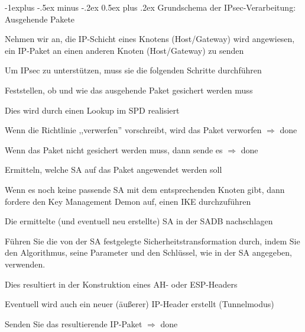 \documentclass[a4paper]{article}
\makeatletter
\renewcommand{\subsection}{\@startsection{subsection}{2}{0mm}%
 {-1explus -.5ex minus -.2ex}%
 {0.5ex plus .2ex}%
 {\normalfont\normalsize\bfseries}}
\makeatother
\begin{document}
\begin{multicols}{3}
      \subsection{Grundschema der IPsec-Verarbeitung: Ausgehende Pakete}
      \begin{itemize*}
            \item Nehmen wir an, die IP-Schicht eines Knotens (Host/Gateway) wird angewiesen, ein IP-Paket an einen anderen Knoten (Host/Gateway) zu senden
            \item Um IPsec zu unterstützen, muss sie die folgenden Schritte durchführen
            \begin{itemize*}
                  \item Feststellen, ob und wie das ausgehende Paket gesichert werden muss
                  \begin{itemize*}
                        \item Dies wird durch einen Lookup im SPD realisiert
                        \item Wenn die Richtlinie ,,verwerfen'' vorschreibt, wird das Paket verworfen $\Rightarrow$ done
                        \item Wenn das Paket nicht gesichert werden muss, dann sende es $\Rightarrow$ done
                  \end{itemize*}
                  \item Ermitteln, welche SA auf das Paket angewendet werden soll
                  \begin{itemize*}
                        \item Wenn es noch keine passende SA mit dem entsprechenden Knoten gibt, dann fordere den Key Management Demon auf, einen IKE durchzuführen
                  \end{itemize*}
                  \item Die ermittelte (und eventuell neu erstellte) SA in der SADB nachschlagen
                  \item Führen Sie die von der SA festgelegte Sicherheitstransformation durch, indem Sie den Algorithmus, seine Parameter und den Schlüssel, wie in der SA angegeben, verwenden.
                  \begin{itemize*}
                        \item Dies resultiert in der Konstruktion eines AH- oder ESP-Headers
                        \item Eventuell wird auch ein neuer (äußerer) IP-Header erstellt (Tunnelmodus)
                  \end{itemize*}
                  \item Senden Sie das resultierende IP-Paket $\Rightarrow$ done
            \end{itemize*}
      \end{itemize*}


\end{multicols}
\end{document}
